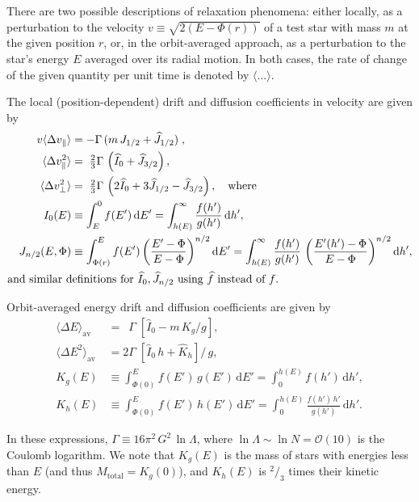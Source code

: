 \documentclass[12pt]{article}
\renewcommand{\d}{\mathrm{d}}
\newcommand{\dvpar}{\langle \Delta v_\| \rangle}
\newcommand{\dvsqpar}{\langle \Delta v^2_\| \rangle}
\newcommand{\dvsqper}{\langle \Delta v^2_\bot \rangle}
\begin{document}
There are two possible descriptions of relaxation phenomena: either locally, as a perturbation to the velocity $v\equiv \sqrt{2(E-\Phi(r))}$ of a test star with mass $m$ at the given position $r$, or, in the orbit-averaged approach, as a perturbation to the star's energy $E$ averaged over its radial motion.
In both cases, the rate of change of the given quantity per unit time is denoted by $\langle \dots \rangle$.

The local (position-dependent) drift and diffusion coefficients in velocity are given by
\begin{subequations}
\begin{align}
v\dvpar &= -\Gamma\, (m\,J_{1/2} + \widehat J_{1/2}) \;,\\
\dvsqpar&= \;\tfrac{2}{3}\Gamma\, \left(\widehat I_0 + \widehat J_{3/2}\right) , \\
\dvsqper&= \;\tfrac{2}{3}\Gamma\, \left(2 \widehat I_0 + 3 \widehat J_{1/2} - \widehat J_{3/2}\right) ,
\quad\mbox{where} \\
I_0(E)     &\equiv \int_E^0 f(E')\, \d E' = \int_{h(E)}^\infty \frac{f(h')}{g(h')}\, \d h', \\
J_{n/2}(E,\Phi) &\equiv \int_{\Phi(r)}^E f(E') \left(\frac{E'-\Phi}{E-\Phi}\right)^{n/2} \d E' = 
 \int_{h(E)}^\infty \frac{f(h')}{g(h')}\, \left(\frac{E'(h')-\Phi}{E-\Phi}\right)^{n/2} \d h', \\
\makebox[20mm][l]{and similar definitions for $\widehat I_0, \widehat J_{n/2}$ using $\widehat f$ instead of $f$.} & \nonumber 
\end{align}
\end{subequations}

Orbit-averaged energy drift and diffusion coefficients are given by
\begin{subequations}  \label{eq:DriftDiffusionE}
\begin{align}
\langle \Delta E   \rangle_\mathrm{av} &= \phantom{2} \Gamma\; \left[\widehat I_0 - m\,K_g/g \right], \\
\langle \Delta E^2 \rangle_\mathrm{av} &= 2\Gamma\; \left[\widehat I_0\,h + \widehat K_h\right] / \,g, \\
K_g(E) &\equiv \int_{\Phi(0)}^E f(E')\,g(E')\,\d E' = \int_0^{h(E)} f(h')\,\d h', \\
K_h(E) &\equiv \int_{\Phi(0)}^E f(E')\,h(E')\,\d E' = \int_0^{h(E)} \frac{f(h')\,h'}{g(h')}\,\d h'.
\end{align}
\end{subequations}

In these expressions, $\Gamma \equiv 16\pi^2\, G^2\, \ln\Lambda$, where $\ln\Lambda \sim \ln N = \mathcal O(10)$ is the Coulomb logarithm. We note that $K_g(E)$ is the mass of stars with energies less than $E$ (and thus $M_\mathrm{total} = K_g(0)$), and $K_h(E)$ is ${}^{2\!}/_{\!3}$ times their kinetic energy.
\end{document}
